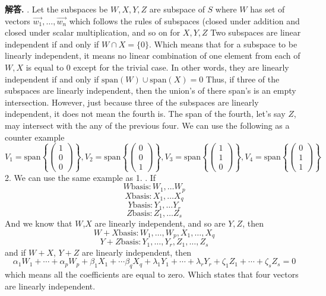 \documentclass[12pt, a4paper, oneside]{article}
\newenvironment{solution}{\par\noindent\textbf{解答. }}{\par}
\begin{document}
\begin{CJK}{UTF8}{gbsn}
\begin{solution} . Let the subspaces be $W,X,Y,Z$ are subspace of $S$ where $W$ has set of vectors $\vec{w_1}, \dots,\vec{w_n}$ which follows the rules of subspaces (closed under addition and closed under scalar multiplication, and so on for $X,Y,Z$ \newline 
  Two subspaces are linear independent if and only if $W \cap X = \{0\}$. Which means that for a subspace to be linearly independent, it means no linear combination of one element from each of $W, X$ is equal to $0$ except for the trivial case.  In other words, they are linearly independent if and only if $\text{span}(W) \cup \text{span}(X) = {0}$ \newline 
  Thus, if three of the subspaces are linearly independent, then the union’s of there span’s is an empty intersection. However, just because three of the subspaces are linearly independent, it does not mean the fourth is. The span of the fourth, let’s say $Z$, may intersect with the any of the previous four.
  We can use the following as a counter example \newline
  $$ V_1 = \text{span}\left\{ \begin{pmatrix} 1 \\ 0 \\ 0 \end{pmatrix} \right\},  V_2 = \text{span}\left\{ \begin{pmatrix} 0 \\ 0 \\ 1 \end{pmatrix} \right\},  V_3 = \text{span}\left\{ \begin{pmatrix} 1 \\ 1 \\ 0 \end{pmatrix} \right\},  V_4 = \text{span}\left\{ \begin{pmatrix} 0 \\ 1 \\ 1 \end{pmatrix} \right\}$$
  2. We can use the same example as 1. . If 
  $$ W \text{basis} : W_1, \dots W_p $$
  $$ X \text{basis} : X_1, \dots X_q $$
  $$ Y \text{basis} : Y_1, \dots Y_r $$
  $$ Z \text{basis} : Z_1, \dots Z_s $$
  And we know that $W$,$X$ are linearly independent, and so are $Y,Z$, then 
  $$ W + X \text{basis} : W_1,\dots,W_p, X_1,\dots,X_q $$ 
  $$ Y + Z \text{basis} : Y_1,\dots,Y_r, Z_1,\dots,Z_s $$
  and if $W + X$, $Y + Z$ are linearly independent, then
  $$ \alpha_1 W_1+ \cdots + \alpha_{p}W_p + \beta_1 X_1 + \cdots \beta_q X_q + \lambda_1 Y_1 + \cdots  + \lambda_r Y_r + \zeta_1Z_1 + \cdots + \zeta_sZ_s  = 0$$
  which means all the coefficients are equal to zero. Which states that four vectors are linearly independent.
\end{solution}



\end{CJK}
\end{document}
